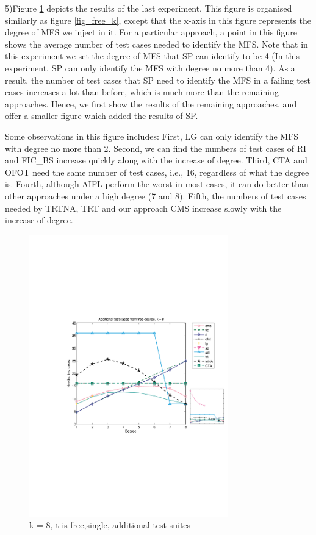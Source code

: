 \documentclass{sig-alternate-05-2015}
\begin{document}
{{5)Figure \ref{fig_free_d} depicts the results of the last experiment. This figure is organised similarly as figure \ref{fig_free_k}, except that the x-axis in this figure represents the degree of MFS we inject in it. For a particular approach, a point in this figure shows the average number of test cases needed to identify the MFS. Note that in this experiment we set the degree of MFS that SP can identify to be 4 (In this experiment, SP can only identify the MFS with degree no more than 4). As a result, the number of test cases that SP need to identify the MFS in a failing test cases increases a lot than before, which is much more than the remaining approaches. Hence, we first show the results of the remaining approaches, and offer a smaller figure which added the results of SP.


Some observations in this figure includes:  First, LG can only identify the MFS with degree no more than 2.  Second, we can find the numbers of test cases of RI and FIC\_BS increase quickly along with the increase of degree. Third, CTA and OFOT need the same number of test cases, i.e., 16, regardless of what the degree is. Fourth, although AIFL perform the worst in most cases, it can do better than other approaches under a high degree (7 and 8).  Fifth, the numbers of test cases needed by TRTNA, TRT and our approach CMS increase slowly with the increase of degree.

\begin{figure}
 \centering
 \includegraphics[width=3.4in]{cpp2.pdf}
 \caption{k = 8, t is free,single, additional test suites}
 \label{fig_free_d}
\end{figure}

}}
\end{document}
